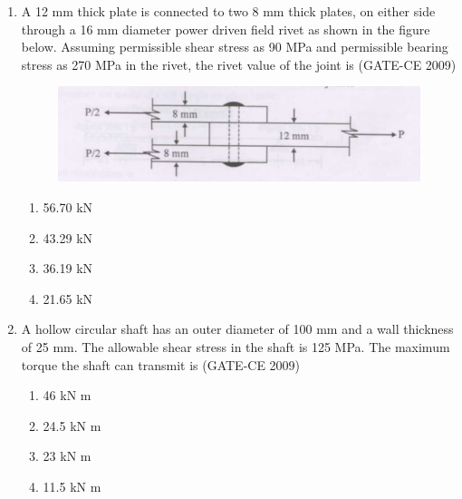 \documentclass[journal,12pt,onecolumn]{article}
\theoremstyle{remark}
\begin{document}
\begin{enumerate}
    \item A 12 mm thick plate is connected to two 8 mm thick plates, on either side through a 16 mm diameter power driven field rivet as shown in the figure below. Assuming permissible shear stress as 90 MPa and permissible bearing stress as 270 MPa in the rivet, the rivet value of the joint is (GATE-CE 2009)
    \begin{figure}[H]
    \centering
    \includegraphics[width=0.7\columnwidth]{figs/image2.jpg}
    \caption{}
    \label{fig:placeholder}
    \end{figure}
    
    \begin{multicols}{2}
    \begin{enumerate}
        \item 56.70 kN 
        \item 43.29 kN
        \item 36.19 kN 
        \item 21.65 kN
    \end{enumerate}
\end{multicols}
    
    \item A hollow circular shaft has an outer diameter of 100 mm and a wall thickness of 25 mm. The allowable shear stress in the shaft is 125 MPa. The maximum torque the shaft can transmit is (GATE-CE 2009)
    \begin{multicols}{2}
    \begin{enumerate}
        \item 46 kN m 
        \item 24.5 kN m 
        \item 23 kN m 
        \item 11.5 kN m
    \end{enumerate}
\end{multicols}
    

\end{enumerate}
\end{document}
